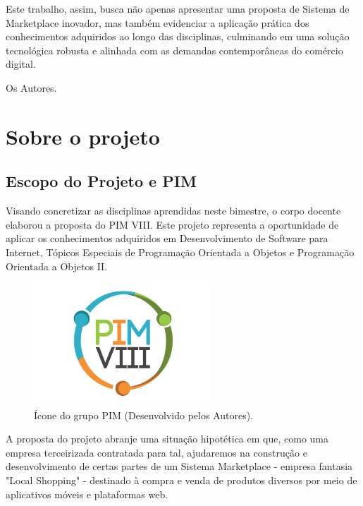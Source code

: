 \documentclass[
	12pt,				%
	openright,			%
	twoside,			%
	a4paper,			%
	english,			%
	brazil				%
	]{abntex2}
\begin{document}
Este trabalho, assim, busca não apenas apresentar uma proposta de Sistema de Marketplace inovador, mas também evidenciar a aplicação prática dos conhecimentos adquiridos ao longo das disciplinas, culminando em uma solução tecnológica robusta e alinhada com as demandas contemporâneas do comércio digital.

Os Autores.



\section{Sobre o projeto}\label{cap_introducao}

\subsection{Escopo do Projeto e PIM}

Visando concretizar as disciplinas aprendidas neste bimestre, o corpo docente elaborou a proposta do PIM VIII. Este projeto representa a oportunidade de aplicar os conhecimentos adquiridos em Desenvolvimento de Software para Internet, Tópicos Especiais de Programação Orientada a Objetos e Programação Orientada a Objetos II.

\begin{figure}[htb]
	\centering
	\includegraphics[width=0.6\textwidth]{img/PIM-VIII-LOGO}
	\caption{Ícone do grupo PIM (Desenvolvido pelos Autores).}
	\label{fig:logo-pim-viii}
\end{figure}

A proposta do projeto abranje uma situação hipotética em que, como uma empresa terceirizada contratada para tal, ajudaremos na construção e desenvolvimento de certas partes de um Sistema Marketplace - empresa fantasia "Local Shopping" -  destinado à compra e venda de produtos diversos por meio de aplicativos móveis e plataformas web.
\end{document}
